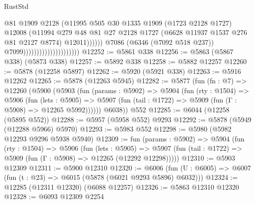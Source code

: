 \begin{lexlean}{RustStd}
\begin{coremodule}
                                                      @81
                                                      @1909
                                                      @2128
                                                      (@11995
                                                        @505
                                                        @30
                                                        @1335
                                                        @1909
                                                        (@1723 @2128 @1727)
                                                        @12008
                                                        (@11994
                                                          @279
                                                          @48
                                                          @81
                                                          @27
                                                          @2128
                                                          @1727
                                                          (@6628 @11937 @1537 @276 @81 @2127 @8774)
                                                          @12011))))))
                                              @7086
                                              (@6346 (@7092 @518 @237))
                                              @7099)))))))))))))))))))))
@12252 := @5861 @338
@12256 := @5863 (@5867 @338) (@5873 @338)
@12257 := @5892 @338
@12258 := @5882 @12257
@12260 := @5878 (@12258 @5897)
@12262 := @5920 (@5921 @338)
@12263 := @5916 @12262
@12265 := @5878 (@12263 @5945)
@12282 := @5877
    (fun (fn : @7) =>
    @12260
      (@5900
        (@5903
          (fun (params : @5902) =>
          @5904
            (fun (rty : @1504) =>
            @5906
              (fun (lets : @5905) =>
              @5907 (fun (tail : @1722) => @5909 (fun (Γ : @5908) => @12265 @5992))))))
        @6038))
    @552
@12285 := @6044 (@12258 (@5895 @552))
@12288 := @5957 (@5958 @552) @9293
@12292 := @5878 (@5949 (@12288 @5966) @5970)
@12293 := @5983 @552
@12298 := @5980 (@5982 @12293 @9296 @5938 @5940)
@12309 := fun (params : @5902) =>
  @5904
    (fun (rty : @1504) =>
    @5906
      (fun (lets : @5905) =>
      @5907 (fun (tail : @1722) => @5909 (fun (Γ : @5908) => @12265 (@12292 @12298)))))
@12310 := @5903 @12309
@12311 := @5900 @12310
@12320 := @6006
    (fun (U : @6005) => @6007 (fun (t : @23) => @6015 (@5878 (@6021 @9293 @5896) @6032)))
@12324 := @12285 (@12311 @12320) (@6088 @12257)
@12326 := @5863 @12310 @12320
@12328 := @6093 @12309 @2254

\end{coremodule}
\end{lexlean}
